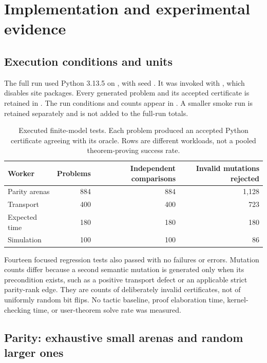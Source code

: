 \section{Implementation and experimental evidence}
\label{sec:experiments}

\subsection{Execution conditions and units}

The full run used Python 3.13.5 on
, with seed . It was
invoked with , which disables site packages. Every generated
problem and its accepted certificate is retained in
. The run conditions and counts appear in
. A smaller smoke run is retained separately
and is not added to the full-run totals.

\begin{table}[ht]
\centering
\begin{tabular}{@{}lrrr@{}}
\toprule
Worker & Problems & Independent comparisons & Invalid mutations rejected \\
\midrule
Parity arenas & 884 & 884 & 1,128 \\
Transport & 400 & 400 & 723 \\
Expected time & 180 & 180 & 180 \\
Simulation & 100 & 100 & 86 \\
\bottomrule
\end{tabular}
\caption{Executed finite-model tests. Each problem produced an accepted Python
certificate agreeing with its oracle. Rows are different workloads, not a
pooled theorem-proving success rate.}
\label{tab:tests}
\end{table}

Fourteen focused regression tests also passed with no failures or errors.
Mutation counts differ because a second semantic mutation is generated only
when its precondition exists, such as a positive transport defect or an
applicable strict parity-rank edge. They are counts of deliberately invalid
certificates, not of uniformly random bit flips. No tactic baseline, proof
elaboration time, kernel-checking time, or user-theorem solve rate was measured.

\subsection{Parity: exhaustive small arenas and random larger ones}

